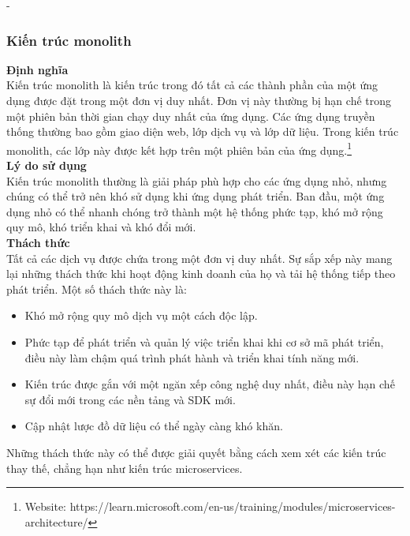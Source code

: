 \begin {list} {-}{}
\subsubsection{Kiến trúc monolith}
\noindent \textbf{Định nghĩa} \\[0.3cm]
\noindent Kiến trúc monolith là kiến trúc trong đó tất cả các thành phần của một ứng dụng được đặt trong một đơn vị duy nhất. Đơn vị này thường bị hạn chế trong một phiên bản thời gian chạy duy nhất của ứng dụng. Các ứng dụng truyền thống thường bao gồm giao diện web, lớp dịch vụ và lớp dữ liệu. Trong kiến trúc monolith, các lớp này được kết hợp trên một phiên bản của ứng dụng.\footnote{Website: https://learn.microsoft.com/en-us/training/modules/microservices-architecture/}\\[0.5cm]
\textbf{Lý do sử dụng}\\[0.5cm]
Kiến trúc monolith thường là giải pháp phù hợp cho các ứng dụng nhỏ, nhưng chúng có thể trở nên khó sử dụng khi ứng dụng phát triển. Ban đầu, một ứng dụng nhỏ có thể nhanh chóng trở thành một hệ thống phức tạp, khó mở rộng quy mô, khó triển khai và khó đổi mới.\\[0.5cm]
\textbf{Thách thức}\\[0.5cm]
Tất cả các dịch vụ được chứa trong một đơn vị duy nhất. Sự sắp xếp này mang lại những thách thức khi hoạt động kinh doanh của họ và tải hệ thống tiếp theo phát triển. Một số thách thức này là:
\begin{itemize}
    \item Khó mở rộng quy mô dịch vụ một cách độc lập.
    \item Phức tạp để phát triển và quản lý việc triển khai khi cơ sở mã phát triển, điều này làm chậm quá trình phát hành và triển khai tính năng mới.
    \item Kiến trúc được gắn với một ngăn xếp công nghệ duy nhất, điều này hạn chế sự đổi mới trong các nền tảng và SDK mới.
    \item Cập nhật lược đồ dữ liệu có thể ngày càng khó khăn.
\end{itemize}
Những thách thức này có thể được giải quyết bằng cách xem xét các kiến trúc thay thế, chẳng hạn như kiến trúc microservices.

\end{list}

